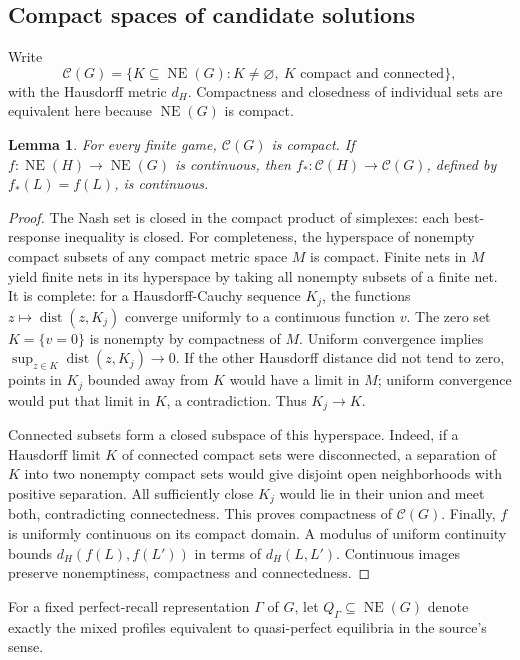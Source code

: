\documentclass[11pt]{article}
\newtheorem{lemma}[theorem]{Lemma}
\theoremstyle{definition}
\newcommand{\NE}{\operatorname{NE}}
\newcommand{\CC}{\mathscr C}
\newcommand{\dist}{\operatorname{dist}}
\begin{document}
\subsection{Compact spaces of candidate solutions}\label{sec:compact}
Write
\[
 \CC(G)=\{K\subseteq\NE(G):K\ne\varnothing,\ K\text{ compact and connected}\},
\]
with the Hausdorff metric $d_H$. Compactness and closedness of individual sets
are equivalent here because $\NE(G)$ is compact.

\begin{lemma}\label{lem:hyperspace}
For every finite game, $\CC(G)$ is compact. If
$f:\NE(H)\to\NE(G)$ is continuous, then
$f_*:\CC(H)\to\CC(G)$, defined by $f_*(L)=f(L)$, is continuous.
\end{lemma}
\begin{proof}
The Nash set is closed in the compact product of simplexes: each best-response
inequality is closed. For completeness, the hyperspace of nonempty compact
subsets of any compact metric space $M$ is compact. Finite nets in $M$ yield
finite nets in its hyperspace by taking all nonempty subsets of a finite net.
It is complete: for a Hausdorff-Cauchy sequence $K_j$, the functions
$z\mapsto\dist(z,K_j)$ converge uniformly to a continuous function $v$.
The zero set $K=\{v=0\}$ is nonempty by compactness of $M$. Uniform convergence
implies $\sup_{z\in K}\dist(z,K_j)\to0$. If the other Hausdorff distance did
not tend to zero, points in $K_j$ bounded away from $K$ would have a limit in
$M$; uniform convergence would put that limit in $K$, a contradiction.
Thus $K_j\to K$.

Connected subsets form a closed subspace of this hyperspace. Indeed, if a
Hausdorff limit $K$ of connected compact sets were disconnected, a separation
of $K$ into two nonempty compact sets would give disjoint open neighborhoods
with positive separation. All sufficiently close $K_j$ would lie in their
union and meet both, contradicting connectedness. This proves compactness of
$\CC(G)$. Finally, $f$ is uniformly continuous on its compact domain. A modulus
of uniform continuity bounds $d_H(f(L),f(L'))$ in terms of $d_H(L,L')$.
Continuous images preserve nonemptiness, compactness and connectedness.
\end{proof}

For a fixed perfect-recall representation $\Gamma$ of $G$, let
$Q_\Gamma\subseteq\NE(G)$ denote exactly the mixed profiles equivalent to
quasi-perfect equilibria in the source's sense.
\end{document}
